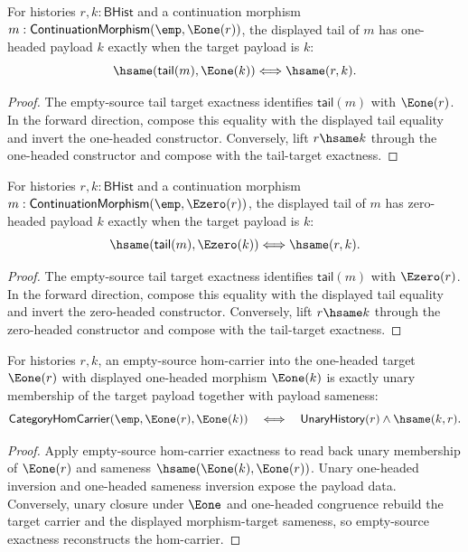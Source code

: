 \begin{theorem}
\label{thm:continuation-morphism-empty-source-e1-target-tail}
For histories $r,k:\mathsf{BHist}$ and a continuation morphism
$m:\mathsf{ContinuationMorphism}(\emp,\Eone(r))$, the displayed tail of $m$
has one-headed payload $k$ exactly when the target payload is $k$:
$$
\hsame(\mathsf{tail}(m),\Eone(k))
\Longleftrightarrow
\hsame(r,k).
$$
\end{theorem}
\begin{proof}
The empty-source tail target exactness identifies $\mathsf{tail}(m)$ with
$\Eone(r)$. In the forward direction, compose this equality with the displayed
tail equality and invert the one-headed constructor. Conversely, lift
$r\hsame k$ through the one-headed constructor and compose with the tail-target
exactness.
\end{proof}

\begin{theorem}
\label{thm:continuation-morphism-empty-source-e0-target-tail}
For histories $r,k:\mathsf{BHist}$ and a continuation morphism
$m:\mathsf{ContinuationMorphism}(\emp,\Ezero(r))$, the displayed tail of $m$
has zero-headed payload $k$ exactly when the target payload is $k$:
$$
\hsame(\mathsf{tail}(m),\Ezero(k))
\Longleftrightarrow
\hsame(r,k).
$$
\end{theorem}
\begin{proof}
The empty-source tail target exactness identifies $\mathsf{tail}(m)$ with
$\Ezero(r)$. In the forward direction, compose this equality with the displayed
tail equality and invert the zero-headed constructor. Conversely, lift
$r\hsame k$ through the zero-headed constructor and compose with the tail-target
exactness.
\end{proof}

\begin{theorem}
\label{thm:category-empty-source-e1-target-payload}
For histories $r,k$, an empty-source hom-carrier into the one-headed target
$\Eone(r)$ with displayed one-headed morphism $\Eone(k)$ is exactly unary
membership of the target payload together with payload sameness:
$$
\mathsf{CategoryHomCarrier}(\emp,\Eone(r),\Eone(k))
\quad\Longleftrightarrow\quad
\mathsf{UnaryHistory}(r)\wedge\hsame(k,r).
$$
\end{theorem}
\begin{proof}
Apply empty-source hom-carrier exactness to read back unary membership of
$\Eone(r)$ and sameness $\hsame(\Eone(k),\Eone(r))$. Unary one-headed inversion
and one-headed sameness inversion expose the payload data. Conversely, unary
closure under $\Eone$ and one-headed congruence rebuild the target carrier and
the displayed morphism-target sameness, so empty-source exactness reconstructs
the hom-carrier.
\end{proof}
